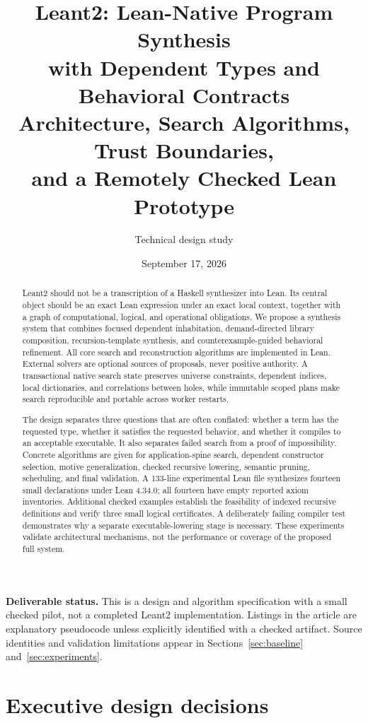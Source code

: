 \documentclass[11pt,a4paper]{article}
\title{\textbf{Leant2: Lean-Native Program Synthesis\\with Dependent Types and Behavioral Contracts}\\[6pt]\large Architecture, Search Algorithms, Trust Boundaries,\\and a Remotely Checked Lean Prototype}
\author{Technical design study}
\date{September 17, 2026}
\theoremstyle{remark}
\begin{document}
\maketitle
\begin{abstract}
Leant2 should not be a transcription of a Haskell synthesizer into Lean. Its central object should be an exact Lean expression under an exact local context, together with a graph of computational, logical, and operational obligations. We propose a synthesis system that combines focused dependent inhabitation, demand-directed library composition, recursion-template synthesis, and counterexample-guided behavioral refinement. All core search and reconstruction algorithms are implemented in Lean. External solvers are optional sources of proposals, never positive authority. A transactional native search state preserves universe constraints, dependent indices, local dictionaries, and correlations between holes, while immutable scoped plans make search reproducible and portable across worker restarts.

The design separates three questions that are often conflated: whether a term has the requested type, whether it satisfies the requested behavior, and whether it compiles to an acceptable executable. It also separates failed search from a proof of impossibility. Concrete algorithms are given for application-spine search, dependent constructor selection, motive generalization, checked recursive lowering, semantic pruning, scheduling, and final validation. A 133-line experimental Lean file synthesizes fourteen small declarations under Lean 4.34.0; all fourteen have empty reported axiom inventories. Additional checked examples establish the feasibility of indexed recursive definitions and verify three small logical certificates. A deliberately failing compiler test demonstrates why a separate executable-lowering stage is necessary. These experiments validate architectural mechanisms, not the performance or coverage of the proposed full system.
\end{abstract}
\vspace{5pt}
\textbf{Deliverable status.} This is a design and algorithm specification with a small checked pilot, not a completed Leant2 implementation. Listings in the article are explanatory pseudocode unless explicitly identified with a checked artifact. Source identities and validation limitations appear in Sections~\ref{sec:baseline} and~\ref{sec:experiments}.
\clearpage
\tableofcontents
\clearpage

\section{Executive design decisions}\label{sec:executive}
\end{document}
